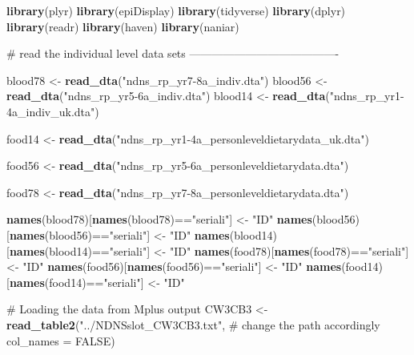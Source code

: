 \documentclass[]{article}
\newenvironment{Shaded}{\begin{snugshade}}{\end{snugshade}}
\newcommand{\KeywordTok}[1]{\textcolor[rgb]{0.12,0.11,0.11}{\textbf{#1}}}
\newcommand{\DataTypeTok}[1]{\textcolor[rgb]{0.00,0.34,0.68}{#1}}
\newcommand{\StringTok}[1]{\textcolor[rgb]{0.75,0.01,0.01}{#1}}
\newcommand{\CommentTok}[1]{\textcolor[rgb]{0.54,0.53,0.53}{#1}}
\newcommand{\OtherTok}[1]{\textcolor[rgb]{0.00,0.43,0.16}{#1}}
\newcommand{\OperatorTok}[1]{\textcolor[rgb]{0.12,0.11,0.11}{#1}}
\newcommand{\NormalTok}[1]{\textcolor[rgb]{0.12,0.11,0.11}{#1}}
\begin{document}
\begin{Shaded}
\begin{Highlighting}[]
\KeywordTok{library}\NormalTok{(plyr)}
\KeywordTok{library}\NormalTok{(epiDisplay)}
\KeywordTok{library}\NormalTok{(tidyverse)}
\KeywordTok{library}\NormalTok{(dplyr)}
\KeywordTok{library}\NormalTok{(readr)}
\KeywordTok{library}\NormalTok{(haven)}
\KeywordTok{library}\NormalTok{(naniar)}



\CommentTok{# read the individual level data sets ----------------------------------------}

\NormalTok{blood78 <-}\StringTok{ }\KeywordTok{read_dta}\NormalTok{(}\StringTok{"ndns_rp_yr7-8a_indiv.dta"}\NormalTok{)}
\NormalTok{blood56 <-}\StringTok{ }\KeywordTok{read_dta}\NormalTok{(}\StringTok{"ndns_rp_yr5-6a_indiv.dta"}\NormalTok{)}
\NormalTok{blood14 <-}\StringTok{ }\KeywordTok{read_dta}\NormalTok{(}\StringTok{"ndns_rp_yr1-4a_indiv_uk.dta"}\NormalTok{)}

\NormalTok{food14 <-}\StringTok{ }\KeywordTok{read_dta}\NormalTok{(}\StringTok{"ndns_rp_yr1-4a_personleveldietarydata_uk.dta"}\NormalTok{)}

\NormalTok{food56 <-}\StringTok{ }\KeywordTok{read_dta}\NormalTok{(}\StringTok{"ndns_rp_yr5-6a_personleveldietarydata.dta"}\NormalTok{)}

\NormalTok{food78 <-}\StringTok{ }\KeywordTok{read_dta}\NormalTok{(}\StringTok{"ndns_rp_yr7-8a_personleveldietarydata.dta"}\NormalTok{)}

\KeywordTok{names}\NormalTok{(blood78)[}\KeywordTok{names}\NormalTok{(blood78)}\OperatorTok{==}\StringTok{"seriali"}\NormalTok{] <-}\StringTok{ "ID"}
\KeywordTok{names}\NormalTok{(blood56)[}\KeywordTok{names}\NormalTok{(blood56)}\OperatorTok{==}\StringTok{"seriali"}\NormalTok{] <-}\StringTok{ "ID"}
\KeywordTok{names}\NormalTok{(blood14)[}\KeywordTok{names}\NormalTok{(blood14)}\OperatorTok{==}\StringTok{"seriali"}\NormalTok{] <-}\StringTok{ "ID"}
\KeywordTok{names}\NormalTok{(food78)[}\KeywordTok{names}\NormalTok{(food78)}\OperatorTok{==}\StringTok{"seriali"}\NormalTok{] <-}\StringTok{ "ID"}
\KeywordTok{names}\NormalTok{(food56)[}\KeywordTok{names}\NormalTok{(food56)}\OperatorTok{==}\StringTok{"seriali"}\NormalTok{] <-}\StringTok{ "ID"}
\KeywordTok{names}\NormalTok{(food14)[}\KeywordTok{names}\NormalTok{(food14)}\OperatorTok{==}\StringTok{"seriali"}\NormalTok{] <-}\StringTok{ "ID"}


\CommentTok{# Loading the data from Mplus output}
\NormalTok{CW3CB3 <-}\StringTok{ }\KeywordTok{read_table2}\NormalTok{(}\StringTok{"../NDNSslot_CW3CB3.txt"}\NormalTok{,  }\CommentTok{# change the path accordingly}
                      \DataTypeTok{col_names =} \OtherTok{FALSE}\NormalTok{)}


\end{Highlighting}
\end{Shaded}
\end{document}
